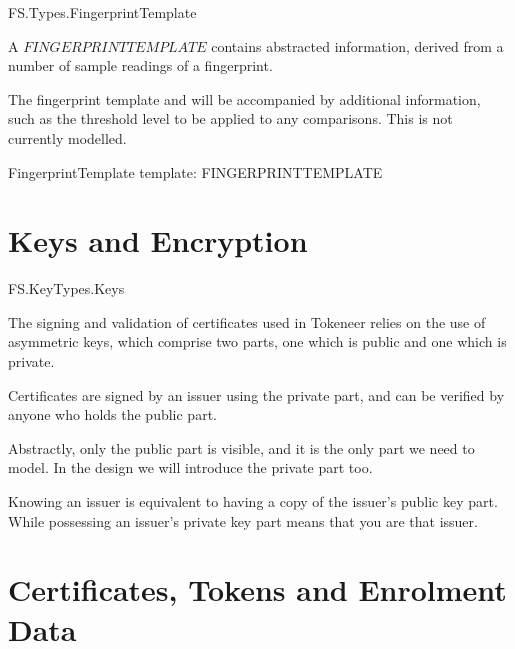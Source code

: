 \begin{traceunit}{FS.Types.FingerprintTemplate}
\end{traceunit}


A $FINGERPRINTTEMPLATE$ contains abstracted information, derived from
a number of sample readings of a fingerprint.

\begin{zed}
	[ FINGERPRINTTEMPLATE ]
\end{zed}

The fingerprint template and will be accompanied by additional information,
such as the threshold level to be applied to any comparisons.
This is not currently modelled.
\begin{schema}{FingerprintTemplate}
	template: FINGERPRINTTEMPLATE
\end{schema}


\section{Keys and Encryption}

\begin{traceunit}{FS.KeyTypes.Keys}
\end{traceunit}

The signing and validation of certificates used in Tokeneer relies on
the use of
asymmetric keys, which comprise two parts, one which is public and
one which is private. 
\begin{zed}
        [ KEYPART ]
\end{zed}

Certificates are signed by an issuer using the private part, and can
be verified by anyone who holds the public part. 

Abstractly, only the public part is visible,
and it is the only part we need to model. In the design we will
introduce the private part too.

Knowing an issuer is equivalent to having a copy of the issuer's
public key part. While possessing an issuer's private key part means 
that you are that issuer.
\section{Certificates, Tokens and Enrolment Data} 
